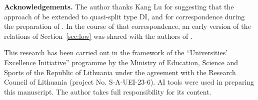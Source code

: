 \documentclass{amsart}
\numberwithin{equation}{section}
\theoremstyle{remark}
\renewcommand{\,}{\kern 0.1em} %
\begin{document}


\medskip
{\noindent \bf Acknowledgements.}
The author thanks Kang Lu for suggesting that the approach of \cite{Re26} be extended to quasi-split
type DI, and for correspondence during the preparation of \cite{HL26}. In the course of that
correspondence, an early version of the relations of Section~\ref{sec:low} was shared with the
authors of \cite{HL26}.

This research has been carried out in the framework of the ``Universities' Excellence Initiative''
programme by the Ministry of Education, Science and Sports of the Republic of Lithuania under the
agreement with the Research Council of Lithuania (project No. S-A-UEI-23-6).
AI tools were used in preparing this manuscript. The author takes full responsibility for its content.



\end{document}
